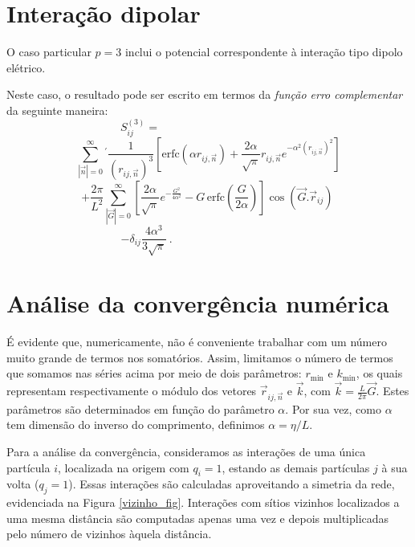 \documentclass[twocolumn,a4,11pt]{article}
\begin{document}
\section{Interação dipolar}

O caso particular $p=3$ inclui o potencial correspondente à interação tipo dipolo elétrico.

Neste caso, o resultado pode ser escrito em termos da {\it função erro complementar} da seguinte maneira:
\begin{equation}
S_{ij}^{(3)}= ~~~~~~~~~~~~~~~~~~~~~~~~~~~~~~~~~~~~~~~~~~~~~~~~~~~~~~~
\nonumber
\end{equation}
\begin{equation}
\sum_{|\vec{n}|=0}^{\infty} {}^{\prime} 
\frac{1}
{ (r_{ij,\vec{n}})^{3} } \left[
\text{erfc}\left(\alpha r_{ij,\vec{n}}\right)
+ \frac{2 \alpha }{\sqrt{\pi}}
r_{ij,\vec{n}}
e^{-\alpha^{2} (r_{ij,\vec{n}})^{2}}
\right]
\nonumber
\end{equation}
\begin{equation}
+\frac{2 \pi}{L^{2}}
\sum_{|\vec{G}|=0}^{\infty}
\left[
\frac{2 \alpha}{\sqrt{\pi}} e^{-\frac{G^{2}}{4\alpha^{2}}}  - G \, \text{erfc} \left( \frac{G}{2 \alpha} \right) \right] 
\cos(\vec{G}.\vec{r}_{ij}) ~
\label{utotal3} \nonumber
\end{equation}
\begin{equation}
-\delta_{ij} \frac{4 \alpha^{3}}{3 \sqrt{\pi}} ~.
~~~~~~~~~~~~~~~~~~~~~~~~~~~~~~~~~~~~~~~~~~~~~~~~~~
\end{equation}

\section{Análise da convergência numérica}
\label{analisenum}

É evidente que, numericamente, não é conveniente trabalhar com um número muito grande de termos nos somatórios. Assim, limitamos o número de termos que somamos nas séries acima por meio de dois parâmetros: $r_{\min}$ e $k_{\min}$, os quais representam respectivamente o módulo dos vetores $\vec{r}_{ij,\vec{n}}$ e $\vec{k}$, com $\vec{k}=\frac{L}{2 \pi}\vec{G}$.
Estes parâmetros são determinados em função do parâmetro $\alpha$.
Por sua vez, como $\alpha$ tem dimensão do inverso do comprimento, definimos $\alpha=\eta/L$.

Para a análise da convergência, consideramos as interações de uma única partícula $i$, localizada na origem com $q_{i}=1$, estando as demais partículas $j$  à sua volta ($q_{j}=1$).
Essas interações são calculadas aproveitando a simetria da rede, evidenciada na Figura \ref{vizinho_fig}. Interações com sítios vizinhos localizados a uma mesma distância são computadas apenas uma vez e depois multiplicadas pelo número de vizinhos àquela distância.
\end{document}
